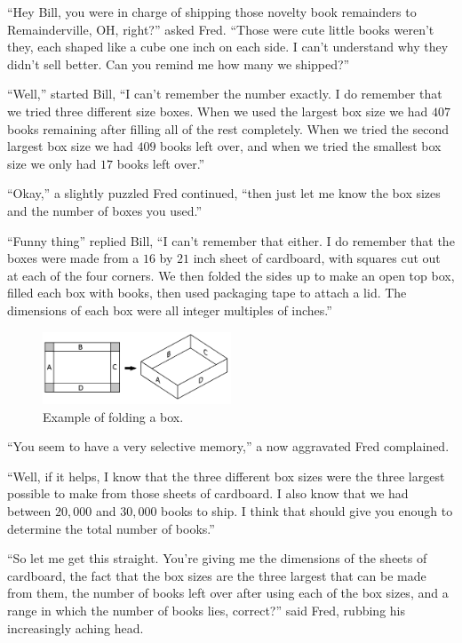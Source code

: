 ``Hey Bill, you were in charge of shipping those novelty book remainders to Remainderville, OH, right?'' asked Fred. ``Those were cute little books weren't they, each shaped like a cube one inch on each side. I can't understand why they didn't sell better. Can you remind me how many we shipped?''

``Well,'' started Bill, ``I can't remember the number exactly. I do remember that we tried three different size boxes. When we used the largest box size we had $407$  books remaining after filling all of the rest completely. When we tried the second largest box size we had $409$ books left over, and when we tried the smallest box size we only had $17$ books left over.''

``Okay,'' a slightly puzzled Fred continued, ``then just let me know the box sizes and the number of boxes you used.''

``Funny thing'' replied Bill, ``I can't remember that either. I do remember that the boxes were made from a $16$ by $21$ inch sheet of cardboard, with squares cut out at each of the four corners. We then folded the sides up to make an open top box, filled each box with books, then used packaging tape to attach a lid. The dimensions of each box were all integer multiples of inches.''
\begin{figure}[!h]
\centering

\includegraphics[width = 0.5\textwidth]{fig1.png}
\caption{Example of folding a box.}
\label{fig1}
\end{figure}

``You seem to have a very selective memory,'' a now aggravated Fred complained.

``Well, if it helps, I know that the three different box sizes were the three largest possible to make from those sheets of cardboard. I also know that we had between $20,000$ and $30,000$ books to ship. I think that should give you enough to determine the total number of books.''

``So let me get this straight. You're giving me the dimensions of the sheets of cardboard, the fact that the box sizes are the three largest that can be made from them, the number of books left over after using each of the box sizes, and a range in which the number of books lies, correct?'' said Fred, rubbing his increasingly aching head.


